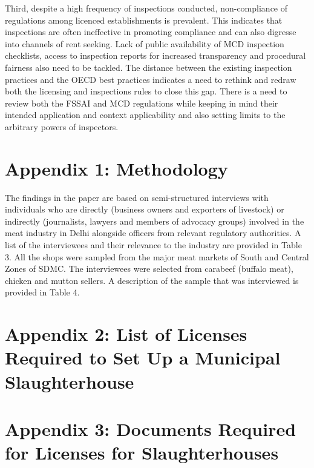 \documentclass[a4paper, 12pt]{article}
\begin{document}
Third, despite a high frequency of inspections conducted, non-compliance of regulations among licenced establishments is prevalent. This indicates that inspections are often ineffective in promoting compliance and can also digresse into channels of rent seeking. Lack of public availability of MCD inspection checklists, access to inspection reports for increased transparency and procedural fairness also need to be tackled. The distance between the existing inspection practices and the OECD best practices indicates a need to rethink and redraw both the licensing and inspections rules to close this gap. There is a need to review both the FSSAI and MCD regulations while keeping in mind their intended application and context applicability and also setting limits to the arbitrary powers of inspectors. \\


\printbibliography[title={Bibliography}]
\newpage 
\section*{Appendix 1: Methodology}
The findings in the paper are based on semi-structured interviews with individuals who are directly (business owners and exporters of livestock) or indirectly (journalists, lawyers and members of advocacy groups) involved in the meat industry in Delhi alongside officers from relevant regulatory authorities. A list of the interviewees and their relevance to the industry are provided in Table 3. 
All the shops were sampled from the major meat markets of South and Central Zones of SDMC. The interviewees were selected from carabeef (buffalo meat), chicken and mutton sellers. A description of the sample that was interviewed is provided in Table 4.

\newpage
\section*{Appendix 2: List of Licenses Required to Set Up a Municipal Slaughterhouse}
\newpage
\section*{Appendix 3: Documents Required for Licenses for Slaughterhouses}
\end{document}
